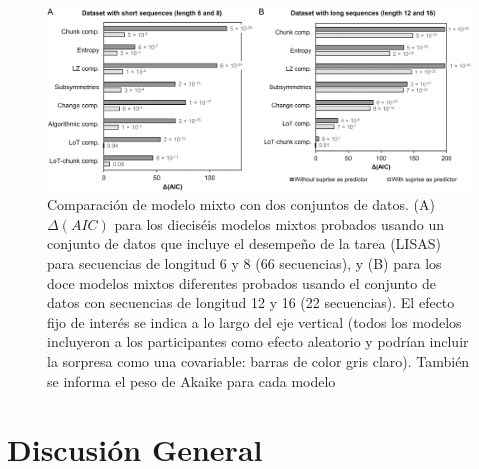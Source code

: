 \begin{figure}[t!]
   \includegraphics[scale=0.8]{figuras/plosbio/journal.pcbi.1008598.g010.PNG}
   
   \centering
   
   \caption{Comparación de modelo mixto con dos conjuntos de datos. (A) $\Delta(AIC)$ para los dieciséis modelos mixtos probados usando un conjunto de datos que incluye el desempeño de la tarea (LISAS) para secuencias de longitud 6 y 8 (66 secuencias), y (B) para los doce modelos mixtos diferentes probados usando el conjunto de datos con secuencias de longitud 12 y 16 (22 secuencias). El efecto fijo de interés se indica a lo largo del eje vertical (todos los modelos incluyeron a los participantes como efecto aleatorio y podrían incluir la sorpresa como una covariable: barras de color gris claro). También se informa el peso de Akaike para cada modelo}
   \label{PlosBIO-F10}
\end{figure}

\section{Discusión General}

